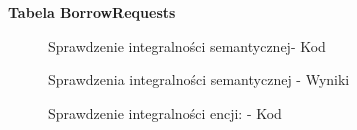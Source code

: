 \textbf{Tabela BorrowRequests}
\begin{figure}[H]
    \centering
    \caption{Sprawdzenie integralności semantycznej- Kod}
\end{figure}
\begin{figure}[H]
    \centering
    \caption{Sprawdzenia integralności semantycznej - Wyniki}
\end{figure}
\begin{figure}[H]
    \centering
    \caption{Sprawdzenie integralności encji: - Kod}
\end{figure}
